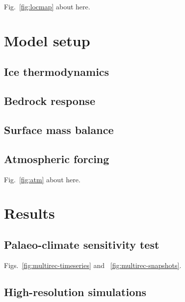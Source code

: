 \documentclass[tc, ms]{copernicus}
\begin{document}
\introduction
\label{sec:intro}

Fig.~\ref{fig:locmap} about here.

\section{Model setup}
\label{sec:model}

\subsection{Ice thermodynamics}

\subsection{Bedrock response}

\subsection{Surface mass balance}

\subsection{Atmospheric forcing}

Fig.~\ref{fig:atm} about here.

\section{Results}
\label{sec:results}

\subsection{Palaeo-climate sensitivity test}

Figs.~\ref{fig:multirec-timeseries} and ~\ref{fig:multirec-snapshots}.

\subsection{High-resolution simulations}
\end{document}
